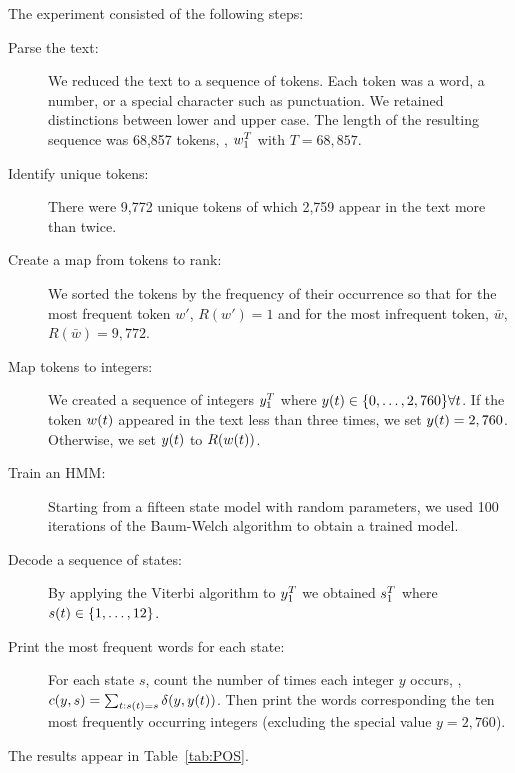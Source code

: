 The experiment consisted of the following steps:
\begin{description}
\item[Parse the text:] We reduced the text to a sequence of tokens.
  Each token was a word, a number, or a special character such as
  punctuation.  We retained distinctions between lower and upper case.
  The length of the resulting sequence was 68,857 tokens, \ie,
  $w_{1}^{T}$ with $T=68,857$.
\item[Identify unique tokens:] There were 9,772 unique tokens of which
  2,759 appear in the text more than twice.
\item[Create a map from tokens to rank:] We sorted the tokens by the
  frequency of their occurrence so that for the most frequent token
  $w'$, $R(w')=1$ and for the most infrequent token, $\bar w$, $R(\bar
  w)=9,772$.
\item[Map tokens to integers:] We created a sequence of integers
  $y_{1}^{T}$ where ${y}{(t)} \in \{0,\ldots,2,760\} \forall
  t$.  If the token ${w}{(t)}$ appeared in the text less than three
  times, we set ${y}{(t)}=2,760$.  Otherwise, we set  ${y}{(t)}$ to
  $R({w}{(t)})$.
\item[Train an HMM:] Starting from a fifteen state model with random
  parameters, we used 100 iterations of the Baum-Welch algorithm to
  obtain a trained model.
\item[Decode a sequence of states:] By applying the Viterbi algorithm
  to $y_{1}^{T}$ we obtained $s_{1}^{T}$ where ${s}{(t)}\in
  \{1,\ldots,12\}$.
\item[Print the most frequent words for each state:] For each state
  $s$, count the number of times each integer $y$ occurs, \ie, $c(y,s)
  = \sum_{t:{s}{(t)}=s} \delta(y,{y}{(t)})$.  Then print the words
  corresponding the ten most frequently occurring integers (excluding
  the special value $y=2,760$).
\end{description}
The results appear in Table~\ref{tab:POS}.

